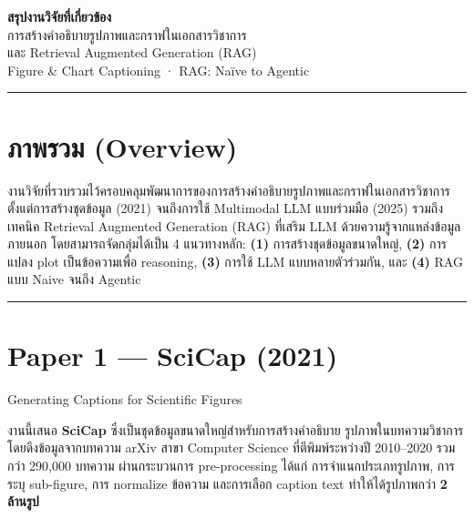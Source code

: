 \documentclass[11pt,a4paper]{article}
\begin{document}
\begin{center}
  {\LARGE \textbf{สรุปงานวิจัยที่เกี่ยวข้อง}}\\[6pt]
  {\large การสร้างคำอธิบายรูปภาพและกราฟในเอกสารวิชาการ}\\[2pt]
  {\large และ Retrieval Augmented Generation (RAG)}\\[4pt]
  {\color{muted}\small Figure \& Chart Captioning · RAG: Naïve to Agentic}
\end{center}

\noindent\rule{\textwidth}{1.5pt}

\vspace{16pt}

\section*{ภาพรวม (Overview)}

งานวิจัยที่รวบรวมไว้ครอบคลุมพัฒนาการของการสร้างคำอธิบายรูปภาพและกราฟในเอกสารวิชาการ
ตั้งแต่การสร้างชุดข้อมูล (2021) จนถึงการใช้ Multimodal LLM แบบร่วมมือ (2025)
รวมถึงเทคนิค Retrieval Augmented Generation (RAG) ที่เสริม LLM
ด้วยความรู้จากแหล่งข้อมูลภายนอก
โดยสามารถจัดกลุ่มได้เป็น 4 แนวทางหลัก:
\textbf{(1)} การสร้างชุดข้อมูลขนาดใหญ่,
\textbf{(2)} การแปลง plot เป็นข้อความเพื่อ reasoning,
\textbf{(3)} การใช้ LLM แบบหลายตัวร่วมกัน, และ
\textbf{(4)} RAG แบบ Naive จนถึง Agentic

\vspace{12pt}
\noindent\rule{\textwidth}{0.5pt}

\section*{Paper 1 — SciCap (2021)}

 Generating Captions for Scientific Figures\\

\vspace{8pt}
\setlength{\parindent}{2em}
งานนี้เสนอ \textbf{SciCap} ซึ่งเป็นชุดข้อมูลขนาดใหญ่สำหรับการสร้างคำอธิบาย
รูปภาพในบทความวิชาการ โดยดึงข้อมูลจากบทความ arXiv สาขา Computer Science
ที่ตีพิมพ์ระหว่างปี 2010--2020 รวมกว่า 290,000 บทความ
ผ่านกระบวนการ pre-processing ได้แก่
การจำแนกประเภทรูปภาพ, การระบุ sub-figure, การ normalize ข้อความ
และการเลือก caption text ทำให้ได้รูปภาพกว่า \textbf{2 ล้านรูป}
\end{document}
